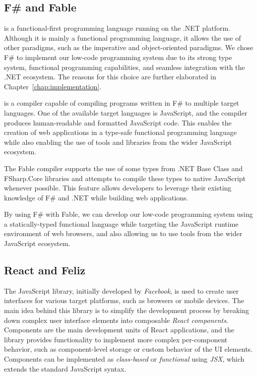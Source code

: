\subsection{F\# and Fable}
\label{sub:Fable}

\citet{fsharp} is a functional-first programming language running on the .NET platform.
Although it is mainly a functional programming language, it allows the use of other paradigms, such as the imperative and object-oriented paradigms.
We chose F\# to implement our low-code programming system due to its strong type system, functional programming capabilities, and seamless integration with the .NET ecosystem.
The reasons for this choice are further elaborated in Chapter~\ref{chap:implementation}.

\citet{fable} is a compiler capable of compiling programs written in F\# to multiple target languages.
One of the available target languages is JavaScript, and the compiler produces human-readable and formatted JavaScript code.
This enables the creation of web applications in a type-safe functional programming language while also enabling the use of tools and libraries from the wider JavaScript ecosystem.

The Fable compiler supports the use of some types from .NET Base Class and FSharp.Core libraries \cite{fable-comp} and attempts to compile these types to native JavaScript whenever possible.
This feature allows developers to leverage their existing knowledge of F\# and .NET while building web applications.

By using F\# with Fable, we can develop our low-code programming system using a statically-typed functional language while targeting the JavaScript runtime environment of web browsers,
and also allowing us to use tools from the wider JavaScript ecosystem.


\subsection{React and Feliz}
The \citet{react} JavaScript library, initially developed by \emph{Facebook}, is used to create user interfaces for various target platforms, such as browsers or mobile devices.
The main idea behind this library is to simplify the development process by breaking down complex user interface elements into composable \emph{React components}.
Components are the main development units of React applications, and the library provides functionality to implement more complex per-component behavior, such as component-level storage or custom behavior of the UI elements.
Components can be implemented as \emph{class-based} or \emph{functional} using \emph{JSX}, which extends the standard JavaScript syntax.

